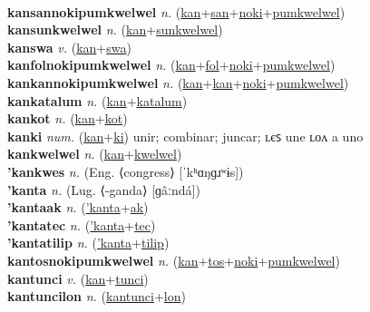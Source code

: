  \label{kancilon} \\
\textbf{kansannokipumkwelwel} \textit{n.} (\hyperref[kan]{kan}+\hyperref[san]{san}+\hyperref[noki]{noki}+\hyperref[pumkwelwel]{pumkwelwel})
 \label{kansannokipumkwelwel} \\
\textbf{kansunkwelwel} \textit{n.} (\hyperref[kan]{kan}+\hyperref[sunkwelwel]{sunkwelwel})
 \label{kansunkwelwel} \\
\textbf{kanswa} \textit{v.} (\hyperref[kan]{kan}+\hyperref[swa]{swa})
 \label{kanswa} \\
\textbf{kanfolnokipumkwelwel} \textit{n.} (\hyperref[kan]{kan}+\hyperref[fol]{fol}+\hyperref[noki]{noki}+\hyperref[pumkwelwel]{pumkwelwel})
 \label{kanfolnokipumkwelwel} \\
\textbf{kankannokipumkwelwel} \textit{n.} (\hyperref[kan]{kan}+\hyperref[kan]{kan}+\hyperref[noki]{noki}+\hyperref[pumkwelwel]{pumkwelwel})
 \label{kankannokipumkwelwel} \\
\textbf{kankatalum} \textit{n.} (\hyperref[kan]{kan}+\hyperref[katalum]{katalum})
 \label{kankatalum} \\
\textbf{kankot} \textit{n.} (\hyperref[kan]{kan}+\hyperref[kot]{kot})
 \label{kankot} \\
\textbf{kanki} \textit{num.} (\hyperref[kan]{kan}+\hyperref[ki]{ki})
unir; combinar; juncar; ʟєꜱ une ʟᴏᴧ a uno \label{kanki} \\
\textbf{kankwelwel} \textit{n.} (\hyperref[kan]{kan}+\hyperref[kwelwel]{kwelwel})
 \label{kankwelwel} \\
\textbf{'kankwes} \textit{n.} (Eng. ⟨congress⟩ [ˈkʰɑŋɡɹʷɨs])
 \label{'kankwes} \\
\textbf{'kanta} \textit{n.} (Lug. ⟨-ganda⟩ [ɡâːndá])
 \label{'kanta} \\
\textbf{'kantaak} \textit{n.} (\hyperref['kanta]{'kanta}+\hyperref[ak]{ak})
 \label{'kantaak} \\
\textbf{'kantatec} \textit{n.} (\hyperref['kanta]{'kanta}+\hyperref[tec]{tec})
 \label{'kantatec} \\
\textbf{'kantatilip} \textit{n.} (\hyperref['kanta]{'kanta}+\hyperref[tilip]{tilip})
 \label{'kantatilip} \\
\textbf{kantosnokipumkwelwel} \textit{n.} (\hyperref[kan]{kan}+\hyperref[tos]{tos}+\hyperref[noki]{noki}+\hyperref[pumkwelwel]{pumkwelwel})
 \label{kantosnokipumkwelwel} \\
\textbf{kantunci} \textit{v.} (\hyperref[kan]{kan}+\hyperref[tunci]{tunci})
 \label{kantunci} \\
\textbf{kantuncilon} \textit{n.} (\hyperref[kantunci]{kantunci}+\hyperref[lon]{lon})
